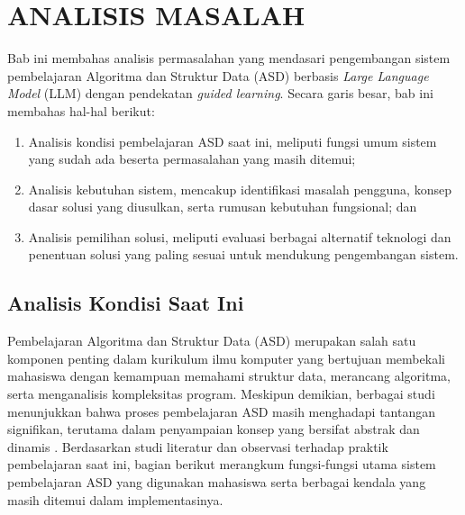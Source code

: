 \cleardoublepage
\chapter{ANALISIS MASALAH}
\label{chap:analisis-masalah}

Bab ini membahas analisis permasalahan yang mendasari pengembangan sistem pembelajaran Algoritma dan Struktur Data (ASD) berbasis \textit{Large Language Model} (LLM) dengan pendekatan \textit{guided learning}. Secara garis besar, bab ini membahas hal-hal berikut:

\begin{enumerate}[1.]
    \item Analisis kondisi pembelajaran ASD saat ini, meliputi fungsi umum sistem yang sudah ada beserta permasalahan yang masih ditemui;
    \item Analisis kebutuhan sistem, mencakup identifikasi masalah pengguna, konsep dasar solusi yang diusulkan, serta rumusan kebutuhan fungsional; dan
    \item Analisis pemilihan solusi, meliputi evaluasi berbagai alternatif teknologi dan penentuan solusi yang paling sesuai untuk mendukung pengembangan sistem.
\end{enumerate}


\section{Analisis Kondisi Saat Ini}

Pembelajaran Algoritma dan Struktur Data (ASD) merupakan salah satu komponen penting dalam kurikulum ilmu komputer yang bertujuan membekali mahasiswa dengan kemampuan memahami struktur data, merancang algoritma, serta menganalisis kompleksitas program. Meskipun demikian, berbagai studi menunjukkan bahwa proses pembelajaran ASD masih menghadapi tantangan signifikan, terutama dalam penyampaian konsep yang bersifat abstrak dan dinamis \autocite{Mtaho2024}. Berdasarkan studi literatur dan observasi terhadap praktik pembelajaran saat ini, bagian berikut merangkum fungsi-fungsi utama sistem pembelajaran ASD yang digunakan mahasiswa serta berbagai kendala yang masih ditemui dalam implementasinya.

